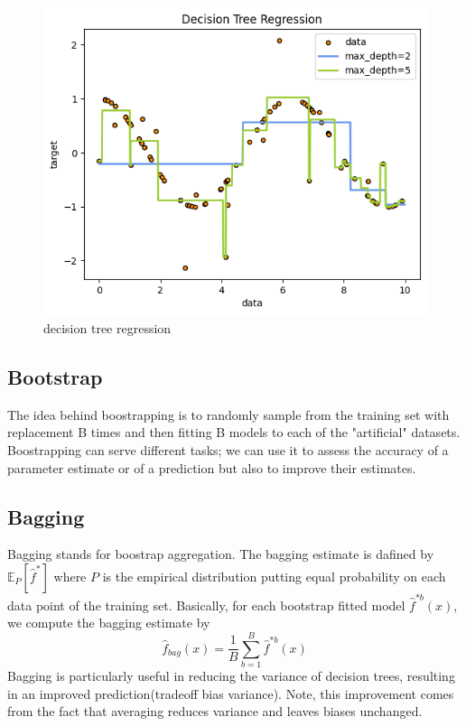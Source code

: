 \begin{figure}
    \includegraphics[width=\textwidth]{images/decision_tree.png}
    \caption{decision tree regression}
    \label{fig:decision_tree}
\end{figure}
    
\subsection{Bootstrap}
The idea behind boostrapping is to randomly sample from the training set with replacement B times and then fitting B models to each of the "artificial" datasets. Boostrapping can serve different tasks; we can use it to assess the accuracy of a parameter estimate or of a prediction but also to improve their estimates.

\subsection{Bagging}
Bagging stands for boostrap aggregation. 
The bagging estimate is dafined by $\mathbb{E}_P[\hat{f}^*]$ where $P$ is the empirical distribution putting equal probability on each data point of the training set.
Basically, for each bootstrap fitted model $\hat{f}^{*b}(x)$, we compute the bagging estimate by
\begin{equation}
    \hat{f}_{bag}(x)=\frac{1}{B}\sum\limits_{b=1}^{B}\hat{f}^{*b}(x)
\end{equation}
Bagging is particularly useful in reducing the variance of decision trees, resulting in an improved prediction(tradeoff bias variance).
Note, this improvement comes from the fact that averaging reduces variance and leaves biases unchanged.

